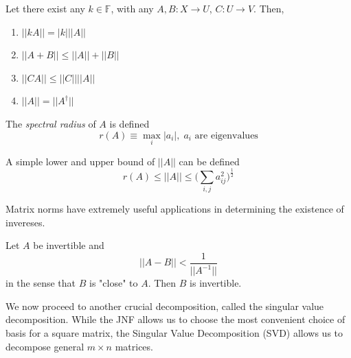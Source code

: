 \documentclass{article}
\begin{document}
    \begin{theorem}
    Let there exist any $k \in \mathbb{F}$, with any $A, B: X \longrightarrow U$, $C: U \longrightarrow V$. Then, 
    \begin{enumerate}
        \item $||k A|| = |k| ||A||$
        \item $||A + B|| \leq ||A|| + ||B||$
        \item $||C A|| \leq ||C|| ||A||$
        \item $||A|| = ||A^\dagger||$
    \end{enumerate}
    \end{theorem}

    \begin{definition}
    The \textit{spectral radius} of $A$ is defined
    \[r(A) \equiv \max_i |a_i|, \; a_i \text{ are eigenvalues}\]
    \end{definition}

    \begin{proposition}
    A simple lower and upper bound of $||A||$ can be defined
    \[ r(A) \leq ||A|| \leq \bigg( \sum_{i, j} a_{i j}^2 \bigg)^\frac{1}{2}\]
    \end{proposition}

    Matrix norms have extremely useful applications in determining the existence of invereses. 

    \begin{theorem}
    Let $A$ be invertible and 
    \[||A - B|| < \frac{1}{||A^{-1}||}\]
    in the sense that $B$ is "close" to $A$. Then $B$ is invertible. 
    \end{theorem}
    We now proceed to another crucial decomposition, called the singular value decomposition. While the JNF allows us to choose the most convenient choice of basis for a square matrix, the Singular Value Decomposition (SVD) allows us to decompose general $m \times n$ matrices. 
\end{document}
